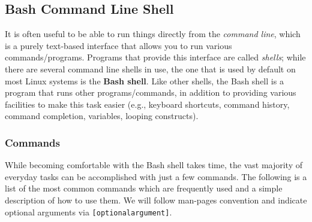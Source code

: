 \documentclass[12pt]{article}
\begin{document}
\subsection{Bash Command Line Shell}
It is often useful to be able to run things directly from the \emph{command line}, which is a purely text-based interface that allows you to run various commands/programs.
Programs that provide this interface are called \emph{shells}; while there are several command line shells in use, the one that is used by default on most Linux systems is the \textbf{Bash shell}.
Like other shells, the Bash shell is a program that runs other programs/commands, in addition to providing various facilities to make this task easier (e.g., keyboard shortcuts, command history, command completion, variables, looping constructs).

\subsubsection{Commands} \label{sec:bashcmd}
While becoming comfortable with the Bash shell takes time, the vast majority of everyday tasks can be accomplished with just a few commands.
The following is a list of the most common commands which are frequently used and a simple description of how to use them.
We will follow man-pages convention and indicate optional arguments via \texttt{[optional\ttul argument]}.
\end{document}
